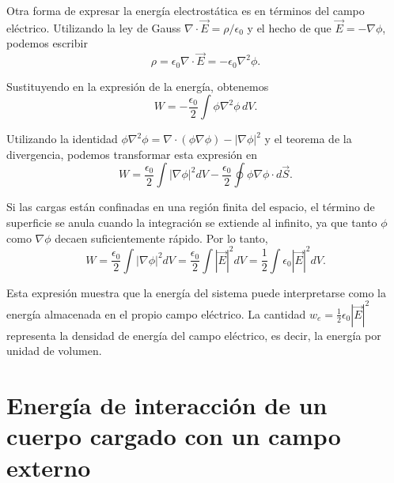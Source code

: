 \documentclass[12pt,a4paper]{book}
\begin{document}
Otra forma de expresar la energía electrostática es en términos del campo eléctrico. Utilizando la ley de Gauss $\nabla \cdot \vec{E} = \rho/\epsilon_0$ y el hecho de que $\vec{E} = -\nabla\phi$, podemos escribir
\begin{equation}
\rho = \epsilon_0 \nabla \cdot \vec{E} = -\epsilon_0 \nabla^2\phi.
\end{equation}

Sustituyendo en la expresión de la energía, obtenemos
\begin{equation}
W = -\frac{\epsilon_0}{2} \int \phi \nabla^2\phi\, dV.
\end{equation}

Utilizando la identidad $\phi \nabla^2\phi = \nabla \cdot (\phi \nabla\phi) - |\nabla\phi|^2$ y el teorema de la divergencia, podemos transformar esta expresión en
\begin{equation}
W = \frac{\epsilon_0}{2} \int |\nabla\phi|^2 dV - \frac{\epsilon_0}{2} \oint \phi \nabla\phi \cdot d\vec{S}.
\end{equation}

Si las cargas están confinadas en una región finita del espacio, el término de superficie se anula cuando la integración se extiende al infinito, ya que tanto $\phi$ como $\nabla\phi$ decaen suficientemente rápido. Por lo tanto,
\begin{equation}
W = \frac{\epsilon_0}{2} \int |\nabla\phi|^2 dV = \frac{\epsilon_0}{2} \int |\vec{E}|^2 dV = \frac{1}{2} \int \epsilon_0 |\vec{E}|^2 dV.
\end{equation}

Esta expresión muestra que la energía del sistema puede interpretarse como la energía almacenada en el propio campo eléctrico. La cantidad $w_e = \frac{1}{2}\epsilon_0 |\vec{E}|^2$ representa la densidad de energía del campo eléctrico, es decir, la energía por unidad de volumen.

\section{Energía de interacción de un cuerpo cargado con un campo externo}
\end{document}
